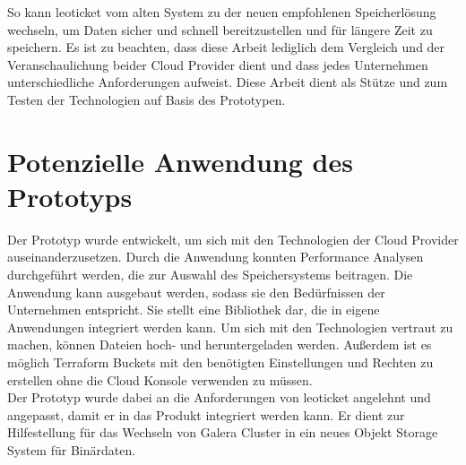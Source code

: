 So kann leoticket vom alten System zu der neuen empfohlenen Speicherlösung wechseln, um Daten sicher und schnell bereitzustellen und für längere Zeit zu speichern. Es ist zu beachten, dass diese Arbeit lediglich dem Vergleich und der Veranschaulichung beider Cloud Provider dient und dass jedes Unternehmen unterschiedliche Anforderungen aufweist. Diese Arbeit dient als Stütze und zum Testen der Technologien auf Basis des Prototypen. 

\section{Potenzielle Anwendung des Prototyps}

Der Prototyp wurde entwickelt, um sich mit den Technologien der Cloud Provider auseinanderzusetzen. Durch die Anwendung konnten Performance Analysen durchgeführt werden, die zur Auswahl des Speichersystems beitragen. Die Anwendung kann ausgebaut werden, sodass sie den Bedürfnissen der Unternehmen entspricht. Sie stellt eine Bibliothek dar, die in eigene Anwendungen integriert werden kann. Um sich mit den Technologien vertraut zu machen, können Dateien hoch- und heruntergeladen werden. Außerdem ist es möglich Terraform Buckets mit den benötigten Einstellungen und Rechten zu erstellen ohne die Cloud Konsole verwenden zu müssen.\\

Der Prototyp wurde dabei an die Anforderungen von leoticket angelehnt und angepasst, damit er in das Produkt integriert werden kann. Er dient zur Hilfestellung für das Wechseln von Galera Cluster in ein neues Objekt Storage System für Binärdaten. 
